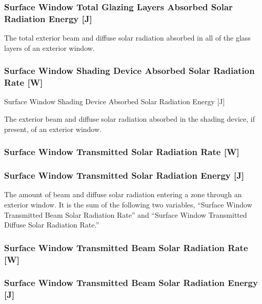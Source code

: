 \subsubsection{Surface Window Total Glazing Layers Absorbed Solar Radiation Energy {[}J{]}}\label{surface-window-total-glazing-layers-absorbed-solar-radiation-energy-j}

The total exterior beam and diffuse solar radiation absorbed in all of the glass layers of an exterior window.

\subsubsection{Surface Window Shading Device Absorbed Solar Radiation Rate {[}W{]}}\label{surface-window-shading-device-absorbed-solar-radiation-rate-w}

Surface Window Shading Device Absorbed Solar Radiation Energy {[}J{]}

The exterior beam and diffuse solar radiation absorbed in the shading device, if present, of an exterior window.

\subsubsection{Surface Window Transmitted Solar Radiation Rate {[}W{]}}\label{surface-window-transmitted-solar-radiation-rate-w}

\subsubsection{Surface Window Transmitted Solar Radiation Energy {[}J{]}}\label{surface-window-transmitted-solar-radiation-energy-j}

The amount of beam and diffuse solar radiation entering a zone through an exterior window. It is the sum of the following two variables, ``Surface Window Transmitted Beam Solar Radiation Rate'' and ``Surface Window Transmitted Diffuse Solar Radiation Rate.''

\subsubsection{Surface Window Transmitted Beam Solar Radiation Rate {[}W{]}}\label{surface-window-transmitted-beam-solar-radiation-rate-w}

\subsubsection{Surface Window Transmitted Beam Solar Radiation Energy {[}J{]}}\label{surface-window-transmitted-beam-solar-radiation-energy-j}

